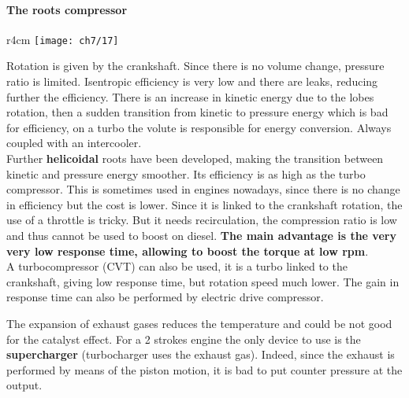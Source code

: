 \paragraph{The roots compressor}
	\begin{wrapfigure}[7]{r}{4cm}
	\vspace{-20mm}
	\texttt{[image: ch7/17]}
	\end{wrapfigure}
	Rotation is given by the crankshaft. Since there is no volume change, pressure ratio is limited. Isentropic efficiency is very low and there are leaks, reducing further the efficiency. There is an increase in kinetic energy due to the lobes rotation, then a sudden transition from kinetic to pressure energy which is bad for efficiency, on a turbo the volute is responsible for energy conversion. Always coupled with an intercooler. \\
	
	Further \textbf{helicoidal} roots have been developed, making the transition between kinetic and pressure energy smoother. Its efficiency is as high as the turbo compressor. This is sometimes used in engines nowadays, since there is no change in efficiency but the cost is lower. Since it is linked to the crankshaft rotation, the use of a throttle is tricky. But it needs recirculation, the compression ratio is low and thus cannot be used to boost on diesel. \textbf{The main advantage is the very very low response time, allowing to boost the torque at low rpm}. \\
	
	A turbocompressor (CVT) can also be used, it is a turbo linked to the crankshaft, giving low response time, but rotation speed much lower. The gain in response time can also be performed by electric drive compressor.  
	
	
	The expansion of exhaust gases reduces the temperature and could be not good for the catalyst effect. For a 2 strokes engine the only device to use is the \textbf{supercharger} (turbocharger uses the exhaust gas). Indeed, since the exhaust is performed by means of the piston motion, it is bad to put counter pressure at the output. 
	

	
